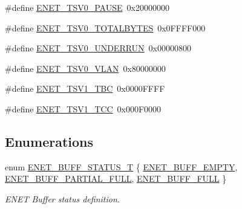\begin{DoxyCompactItemize}
$$\item 
\#define \hyperlink{group__ENET__17XX__40XX_ga389586db52739a1a88da7059b813cf80}{E\+N\+E\+T\+\_\+\+T\+S\+V0\+\_\+\+P\+A\+U\+SE}~0x20000000
\item 
\#define \hyperlink{group__ENET__17XX__40XX_gaced2c895c68a65e25f18810332a9e60c}{E\+N\+E\+T\+\_\+\+T\+S\+V0\+\_\+\+T\+O\+T\+A\+L\+B\+Y\+T\+ES}~0x0\+F\+F\+F\+F000
\item 
\#define \hyperlink{group__ENET__17XX__40XX_ga62faeddfcb2c47a79c79eafd0d53ae70}{E\+N\+E\+T\+\_\+\+T\+S\+V0\+\_\+\+U\+N\+D\+E\+R\+R\+UN}~0x00000800
\item 
\#define \hyperlink{group__ENET__17XX__40XX_gacc8396f1c837bf51215f1f29a062bba4}{E\+N\+E\+T\+\_\+\+T\+S\+V0\+\_\+\+V\+L\+AN}~0x80000000
\item 
\#define \hyperlink{group__ENET__17XX__40XX_ga85659c24bcb857d841bc18e037ee3a78}{E\+N\+E\+T\+\_\+\+T\+S\+V1\+\_\+\+T\+BC}~0x0000\+F\+F\+FF
\item 
\#define \hyperlink{group__ENET__17XX__40XX_ga9a2d8f8be313560a8d1858f623d5d599}{E\+N\+E\+T\+\_\+\+T\+S\+V1\+\_\+\+T\+CC}~0x000\+F0000
\end{DoxyCompactItemize}
\subsection*{Enumerations}
\begin{DoxyCompactItemize}
\item 
enum \hyperlink{group__ENET__17XX__40XX_gab29d71439401a8d4f68643acfd10959b}{E\+N\+E\+T\+\_\+\+B\+U\+F\+F\+\_\+\+S\+T\+A\+T\+U\+S\+\_\+T} \{ \hyperlink{group__ENET__17XX__40XX_ggab29d71439401a8d4f68643acfd10959ba3f06386ec3b80ad2f5abd3b7e4bd46ce}{E\+N\+E\+T\+\_\+\+B\+U\+F\+F\+\_\+\+E\+M\+P\+TY}, 
\hyperlink{group__ENET__17XX__40XX_ggab29d71439401a8d4f68643acfd10959ba242d1f03fa0a6658fb83e72bb4046c7f}{E\+N\+E\+T\+\_\+\+B\+U\+F\+F\+\_\+\+P\+A\+R\+T\+I\+A\+L\+\_\+\+F\+U\+LL}, 
\hyperlink{group__ENET__17XX__40XX_ggab29d71439401a8d4f68643acfd10959bacaa757380b8ad295693f72762f49163e}{E\+N\+E\+T\+\_\+\+B\+U\+F\+F\+\_\+\+F\+U\+LL}
 \}\begin{DoxyCompactList}\small\item\em E\+N\+ET Buffer status definition. \end{DoxyCompactList}
\end{DoxyCompactItemize}
